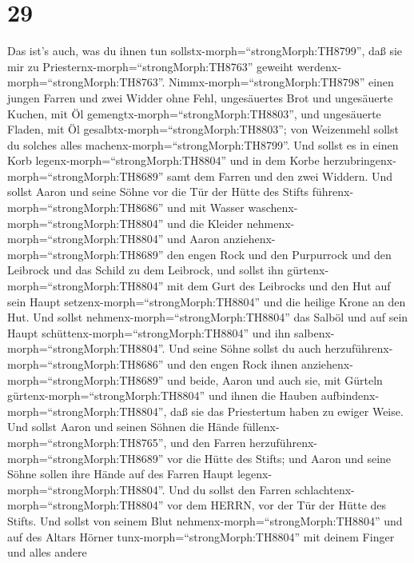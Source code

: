 \hypertarget{section-28}{%
\section{29}\label{section-28}}

 Das ist's auch, was du ihnen tun
sollstx-morph=``strongMorph:TH8799'', daß sie mir zu
Priesternx-morph=``strongMorph:TH8763'' geweiht
werdenx-morph=``strongMorph:TH8763''. Nimmx-morph=``strongMorph:TH8798''
einen jungen Farren und zwei Widder ohne Fehl,  ungesäuertes
Brot und ungesäuerte Kuchen, mit Öl
gemengtx-morph=``strongMorph:TH8803'', und ungesäuerte Fladen, mit Öl
gesalbtx-morph=``strongMorph:TH8803''; von Weizenmehl sollst du solches
alles machenx-morph=``strongMorph:TH8799''.  Und sollst es
in einen Korb legenx-morph=``strongMorph:TH8804'' und in dem Korbe
herzubringenx-morph=``strongMorph:TH8689'' samt dem Farren und den zwei
Widdern.  Und sollst Aaron und seine Söhne vor die Tür der
Hütte des Stifts führenx-morph=``strongMorph:TH8686'' und mit Wasser
waschenx-morph=``strongMorph:TH8804''  und die Kleider
nehmenx-morph=``strongMorph:TH8804'' und Aaron
anziehenx-morph=``strongMorph:TH8689'' den engen Rock und den Purpurrock
und den Leibrock und das Schild zu dem Leibrock, und sollst ihn
gürtenx-morph=``strongMorph:TH8804'' mit dem Gurt des Leibrocks
 und den Hut auf sein Haupt
setzenx-morph=``strongMorph:TH8804'' und die heilige Krone an den Hut.
 Und sollst nehmenx-morph=``strongMorph:TH8804'' das Salböl
und auf sein Haupt schüttenx-morph=``strongMorph:TH8804'' und ihn
salbenx-morph=``strongMorph:TH8804''.  Und seine Söhne
sollst du auch herzuführenx-morph=``strongMorph:TH8686'' und den engen
Rock ihnen anziehenx-morph=``strongMorph:TH8689''  und
beide, Aaron und auch sie, mit Gürteln
gürtenx-morph=``strongMorph:TH8804'' und ihnen die Hauben
aufbindenx-morph=``strongMorph:TH8804'', daß sie das Priestertum haben
zu ewiger Weise. Und sollst Aaron und seinen Söhnen die Hände
füllenx-morph=``strongMorph:TH8765'',  und den Farren
herzuführenx-morph=``strongMorph:TH8689'' vor die Hütte des Stifts; und
Aaron und seine Söhne sollen ihre Hände auf des Farren Haupt
legenx-morph=``strongMorph:TH8804''.  Und du sollst den
Farren schlachtenx-morph=``strongMorph:TH8804'' vor dem HERRN, vor der
Tür der Hütte des Stifts.  Und sollst von seinem Blut
nehmenx-morph=``strongMorph:TH8804'' und auf des Altars Hörner
tunx-morph=``strongMorph:TH8804'' mit deinem Finger und alles andere
